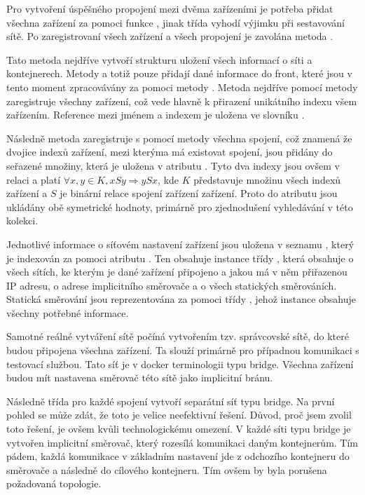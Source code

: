 Pro vytvoření úspěšného propojení mezi dvěma zařízeními je potřeba přidat všechna zařízení za pomoci funkce , jinak třída vyhodí výjimku při sestavování sítě. Po zaregistrovaní všech zařízení a všech propojení je zavolána metoda . 

Tato metoda nejdříve vytvoří strukturu uložení všech informací o síti a kontejnerech. Metody  a  totiž pouze přidají dané informace do front, které jsou v tento moment zpracovávány za pomoci metody . Metoda nejdříve pomocí metody  zaregistruje všechny zařízení, což vede hlavně k přirazení unikátního indexu všem zařízením. Reference mezi jménem a indexem je uložena ve slovníku . 

Následně metoda zaregistruje s pomocí metody  všechna spojení, což znamená že dvojice indexů zařízení, mezi kterýma má existovat spojení, jsou přidány do seřazené množiny, která je uložena v atributu . Tyto dva indexy jsou ovšem v relaci a platí $\forall x,y \in K, xSy \Rightarrow ySx$, kde $K$ představuje množinu všech indexů zařízení a $S$ je binární relace spojení zařízení zařízení.
Proto do atributu  jsou ukládány obě symetrické hodnoty, primárně pro zjednodušení vyhledávání v této kolekci.

Jednotlivé informace o síťovém nastavení zařízení jsou uložena v seznamu , který je indexován za pomoci atributu . Ten obsahuje instance třídy , která obsahuje o všech sítích, ke kterým je dané zařízení připojeno a jakou má v něm přiřazenou IP adresu, o adrese implicitního směrovače a o všech statických směrováních. Statická směrování jsou reprezentována za pomoci třídy , jehož instance obsahuje všechny potřebné informace. 

Samotné reálné vytváření sítě počíná vytvořením tzv. správcovské sítě, do které budou připojena všechna zařízení. Ta slouží primárně pro případnou komunikaci s testovací službou. Tato síť je v docker terminologii typu bridge. Všechna zařízení budou mít nastavena směrovač této sítě jako implicitní bránu.

Následně třída pro každé spojení vytvoří separátní síť typu bridge. Na první pohled se může zdát, že toto je velice neefektivní řešení. Důvod, proč jsem zvolil toto řešení, je ovšem kvůli technologickému omezení. V každé síti typu bridge je vytvořen implicitní směrovač, který rozesílá komunikaci daným kontejnerům. Tím pádem, každá komunikace v základním nastavení jde z odchozího kontejneru do směrovače a následně do cílového kontejneru. Tím ovšem by byla porušena požadovaná topologie. 

